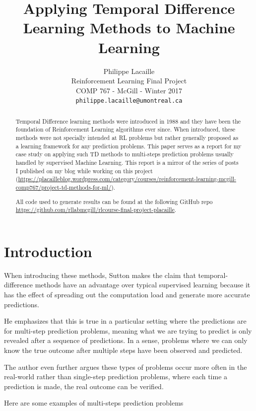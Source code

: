 \documentclass{article}
\title{Applying Temporal Difference Learning Methods to Machine Learning}
\author{
  Philippe Lacaille \\
  Reinforcement Learning Final Project \\
  COMP 767 - McGill - Winter 2017 \\
  \texttt{philippe.lacaille@umontreal.ca} \\
}
\begin{document}

\maketitle

\begin{abstract}
  Temporal Difference learning methods were introduced in 1988 and they have been the foundation of Reinforcement Learning algorithms ever since. When introduced, these methods were not specially intended at RL problems but rather generally proposed as a learning framework for any prediction problems. This paper serves as a report for my case study on applying such TD methods to multi-steps prediction problems usually handled by supervised Machine Learning. This report is a mirror of the series of posts I published on my blog while working on this project (\url{https://placailleblog.wordpress.com/category/courses/reinforcement-learning-mcgill-comp767/project-td-methods-for-ml/}).

  All code used to generate results can be found at the following GitHub repo\\ \url{https://github.com/rllabmcgill/rlcourse-final-project-placaille}.
\end{abstract}

\section{Introduction}

When introducing these methods, Sutton \cite{sutton1988learning} makes the claim that temporal-difference methods have an advantage over typical supervised learning because it has the effect of spreading out the computation load and generate more accurate predictions.

He emphasizes that this is true in a particular setting where the predictions are for multi-step prediction problems, meaning what we are trying to predict is only revealed after a sequence of predictions. In a sense, problems where we can only know the true outcome after multiple steps have been observed and predicted.

The author even further argues these types of problems occur more often in the real-world rather than single-step prediction problems, where each time a prediction is made, the real outcome can be verified.

Here are some examples of multi-steps prediction problems
\end{document}
